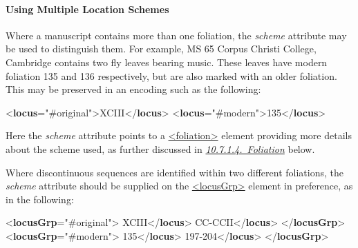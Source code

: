 \paragraph[{Using Multiple Location Schemes}]{Using Multiple Location Schemes}\par
Where a manuscript contains more than one foliation, the {\itshape scheme} attribute may be used to distinguish them. For example, MS 65 Corpus Christi College, Cambridge contains two fly leaves bearing music. These leaves have modern foliation 135 and 136 respectively, but are also marked with an older foliation. This may be preserved in an encoding such as the following: \par\bgroup{}\exampleFont \begin{shaded}\noindent\mbox{}{<\textbf{locus}\hspace*{1em}{scheme}="{\#original}">}XCIII{</\textbf{locus}>}\mbox{}\newline 
{<\textbf{locus}\hspace*{1em}{scheme}="{\#modern}">}135{</\textbf{locus}>}\end{shaded}\egroup\par \noindent  Here the {\itshape scheme} attribute points to a \hyperref[TEI.foliation]{<foliation>} element providing more details about the scheme used, as further discussed in \textit{\hyperref[msphfo]{10.7.1.4.\ Foliation}} below.\par
Where discontinuous sequences are identified within two different foliations, the {\itshape scheme} attribute should be supplied on the \hyperref[TEI.locusGrp]{<locusGrp>} element in preference, as in the following: \par\bgroup{}\exampleFont \begin{shaded}\noindent\mbox{}{<\textbf{locusGrp}\hspace*{1em}{scheme}="{\#original}">}\mbox{}\newline 
{}XCIII{</\textbf{locus}>}\mbox{}\newline 
{}CC-CCII{</\textbf{locus}>}\mbox{}\newline 
{</\textbf{locusGrp}>}\mbox{}\newline 
{<\textbf{locusGrp}\hspace*{1em}{scheme}="{\#modern}">}\mbox{}\newline 
{}135{</\textbf{locus}>}\mbox{}\newline 
{}197-204{</\textbf{locus}>}\mbox{}\newline 
{</\textbf{locusGrp}>}\end{shaded}\egroup\par 
